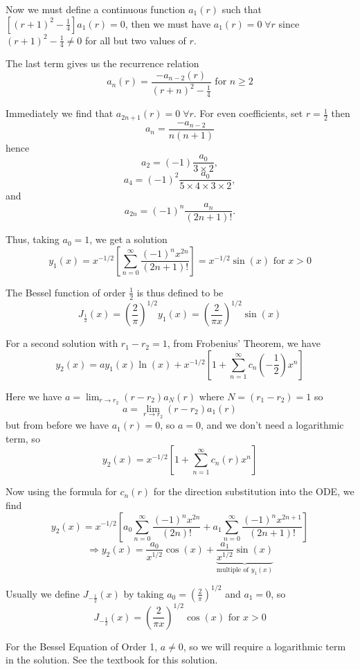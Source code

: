 \documentclass[11pt]{article}
\newcommand{\sumseries}{\sum_{n=0}^{\infty}}
\newcommand{\sumseriesone}{\sum_{n=1}^{\infty}}
\begin{document}
	Now we must define a continuous function $a_1 (r)$ such that $\left[(r+1)^2 - \frac{1}{4} \right] a_1 (r) = 0$, then we must have $a_1 (r) = 0 \; \forall r$ since $(r+1)^2 - \frac{1}{4} \neq 0$ for all but two values of $r$.

	The last term gives us the recurrence relation
		$$ \boxed{a_n (r) = \frac{- a_{n-2} (r)}{(r+n)^2 - \frac{1}{4}} \text{ for } n \geq 2} $$

	Immediately we find that $a_{2n+1} (r) = 0 \; \forall r$. For even coefficients, set $r = \frac{1}{2}$ then
		$$ a_n = \frac{- a_{n-2}}{n(n+1)} $$
	hence
		$$ a_2 = (-1) \frac{a_0}{3 \times 2} ,$$
		$$ a_4 = (-1)^2 \frac{a_0}{5 \times 4 \times 3 \times 2}, $$
	and
		$$ a_{2n} = (-1)^n \frac{a_n}{(2n+1)!}.$$

	Thus, taking $a_0 = 1$, we get a solution
		$$ \boxed{y_1 (x) = x^{-1/2} \left[\sumseries \frac{(-1)^n x^{2n}}{(2n+1)!}\right] = x^{-1/2} \sin (x)} \text{ for } x > 0 $$

	The Bessel function of order $\frac{1}{2}$ is thus defined to be
		$$ \boxed{J_{\frac{1}{2}} (x) = \left(\frac{2}{\pi}\right)^{1/2} y_1 (x) = \left( \frac{2}{\pi x} \right)^{1/2} \sin(x)} $$

	For a second solution with $r_1 - r_2 = 1$, from Frobenius' Theorem, we have
		$$ y_2 (x) = a y_1 (x) \ln (x) + x^{-1/2} \left[ 1 + \sumseriesone c_n \left(- \frac{1}{2} \right) x^n \right] $$

	Here we have $a = \lim_{r \to r_2} (r-r_2)a_N (r)$ where $N = (r_1 - r_2) = 1$ so
		$$ a = \lim_{r \to r_2} (r - r_2) a_1 (r) $$
	but from before we have $a_1 (r) = 0$, so $a = 0$, and we don't need a logarithmic term, so
		$$ y_2 (x) = x^{-1/2} \left[1 + \sumseriesone c_n (r) x^n \right] $$

	Now using the formula for $c_n (r)$ for the direction substitution into the ODE, we find
		$$ y_2 (x) = x^{-1/2} \left[ a_0 \sumseries \frac{(-1)^n x^{2n}}{(2n)!} + a_1 \sumseries \frac{(-1)^n x^{2n+1}}{(2n+1)!} \right] $$
		$$ \Rightarrow y_2 (x) = \frac{a_0}{x^{1/2}} \cos(x) + \underbrace{\frac{a_1}{x^{1/2}} \sin(x)}_{\text{multiple of } y_1 (x)} $$

	Usually we define $J_{-\frac{1}{2}} (x)$ by taking $a_0 = \left(\frac{2}{\pi}\right)^{1/2}$ and $a_1 = 0$, so
		$$ \boxed{J_{-\frac{1}{2}} (x) = \left(\frac{2}{\pi x}\right)^{1/2} \cos(x)} \text{ for } x > 0 $$


	For the Bessel Equation of Order 1, $a \neq 0$, so we will require a logarithmic term in the solution. See the textbook for this solution.
\end{document}
